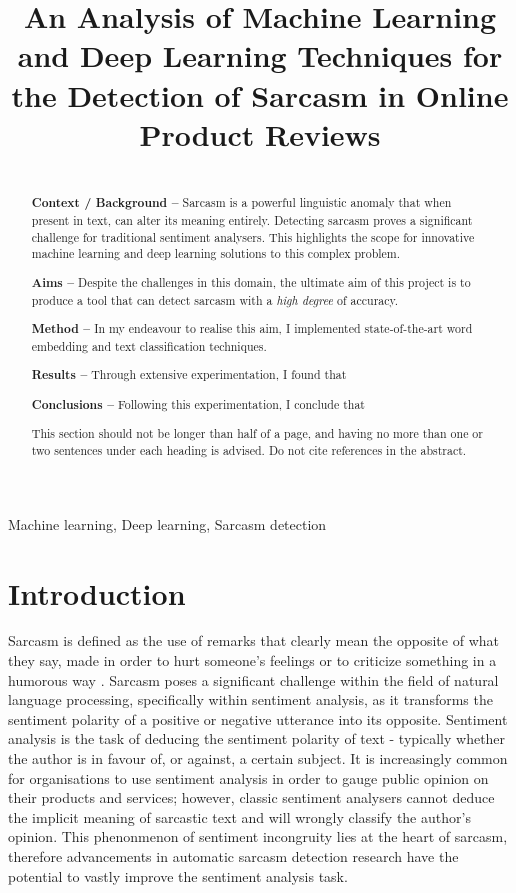 \documentclass[12pt,a4paper]{article}
\title{An Analysis of Machine Learning and Deep Learning Techniques for the Detection of Sarcasm in Online Product Reviews}
\author{} %
\date{}
\begin{document}
\maketitle

\begin{abstract}
\\ \indent \textbf{Context / Background --} 
Sarcasm is a powerful linguistic anomaly that when present in text, can alter its meaning entirely. Detecting sarcasm proves a significant challenge for traditional sentiment analysers. This highlights the scope for innovative machine learning and deep learning solutions to this complex problem.

\indent \textbf{Aims --} Despite the challenges in this domain, the ultimate aim of this project is to produce a tool that can detect sarcasm with a \textit{high degree} of accuracy.

\indent \textbf{Method --} In my endeavour to realise this aim, I implemented state-of-the-art word embedding and text classification techniques.

\indent \textbf{Results --} Through extensive experimentation, I found that

\indent \textbf{Conclusions --} Following this experimentation, I conclude that

This section should not be longer than half of a page, and having no more than one or two sentences under each heading is advised. Do not cite references in the abstract.
\end{abstract}

\begin{keywords}
Machine learning, Deep learning, Sarcasm detection
\end{keywords}

\newpage

\section{Introduction}
\noindent Sarcasm is defined as the use of remarks that clearly mean the opposite of what they say, made in order to hurt someone's feelings or to criticize something in a humorous way \cite{cambridgesarcasm2019}. Sarcasm poses a significant challenge within the field of natural language processing, specifically within sentiment analysis, as it transforms the sentiment polarity of a positive or negative utterance into its opposite. Sentiment analysis is the task of deducing the sentiment polarity of text - typically whether the author is in favour of, or against, a certain subject. It is increasingly common for organisations to use sentiment analysis in order to gauge public opinion on their products and services; however, classic sentiment analysers cannot deduce the implicit meaning of sarcastic text and will wrongly classify the author's opinion. This phenonmenon of sentiment incongruity lies at the heart of sarcasm, therefore advancements in automatic sarcasm detection research have the potential to vastly improve the sentiment analysis task.\\
\end{document}
